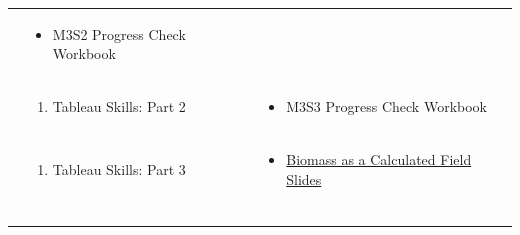 \documentclass[
]{book}
\providecommand{\tightlist}{%
  \setlength{\itemsep}{0pt}\setlength{\parskip}{0pt}}
\begin{document}
\begin{longtable}[]{@{}lll@{}}
\begin{minipage}[t]{0.34\columnwidth}
\end{minipage} & \begin{minipage}[t]{0.42\columnwidth}\raggedright
\begin{itemize}
\tightlist
\item
  M3S2 Progress Check Workbook
\end{itemize}\strut
\end{minipage}\tabularnewline
\begin{minipage}[t]{0.15\columnwidth}\raggedright
\strut
\end{minipage} & \begin{minipage}[t]{0.34\columnwidth}\raggedright
\begin{enumerate}
\def\labelenumi{\arabic{enumi}.}
\setcounter{enumi}{2}
\tightlist
\item
  Tableau Skills: Part 2
\end{enumerate}\strut
\end{minipage} & \begin{minipage}[t]{0.42\columnwidth}\raggedright
\begin{itemize}
\tightlist
\item
  M3S3 Progress Check Workbook
\end{itemize}\strut
\end{minipage}\tabularnewline
\begin{minipage}[t]{0.15\columnwidth}\raggedright
\strut
\end{minipage} & \begin{minipage}[t]{0.34\columnwidth}\raggedright
\begin{enumerate}
\def\labelenumi{\arabic{enumi}.}
\setcounter{enumi}{3}
\tightlist
\item
  Tableau Skills: Part 3
\end{enumerate}\strut
\end{minipage} & \begin{minipage}[t]{0.42\columnwidth}\raggedright
\begin{itemize}
\tightlist
\item
  \href{files/M3S4_calculated_field_biomass_example.pdf}{Biomass as a Calculated Field Slides}
\end{itemize}\strut
\end{minipage}\tabularnewline
\begin{minipage}[t]{0.15\columnwidth}\raggedright
\strut
\end{minipage} & \begin{minipage}[t]{0.34\columnwidth}\raggedright
\begin{enumerate}

\end{enumerate}
\end{minipage}
\end{longtable}
\end{document}
